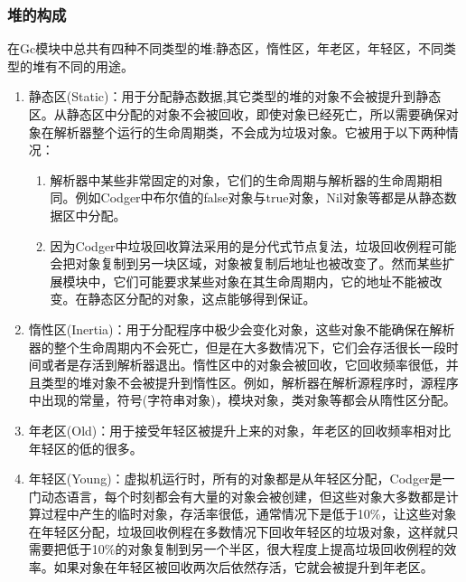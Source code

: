 \subsubsection{堆的构成}
在Gc模块中总共有四种不同类型的堆:静态区，惰性区，年老区，年轻区，不同类型的堆有不同的用途。
\begin{enumerate}
\item 静态区(Static)：用于分配静态数据,其它类型的堆的对象不会被提升到静态区。从静态区中分配的对象不会被回收，即使对象已经死亡，所以需要确保对象在解析器整个运行的生命周期类，不会成为垃圾对象。它被用于以下两种情况：
\begin{enumerate}
\item 解析器中某些非常固定的对象，它们的生命周期与解析器的生命周期相同。例如Codger中布尔值的false对象与true对象，Nil对象等都是从静态数据区中分配。
\item 因为Codger中垃圾回收算法采用的是分代式节点复法，垃圾回收例程可能会把对象复制到另一块区域，对象被复制后地址也被改变了。然而某些扩展模块中，它们可能要求某些对象在其生命周期内，它的地址不能被改变。在静态区分配的对象，这点能够得到保证。
\end{enumerate}
\item 惰性区(Inertia)：用于分配程序中极少会变化对象，这些对象不能确保在解析器的整个生命周期内不会死亡，但是在大多数情况下，它们会存活很长一段时间或者是存活到解析器退出。惰性区中的对象会被回收，它回收频率很低，并且类型的堆对象不会被提升到惰性区。例如，解析器在解析源程序时，源程序中出现的常量，符号(字符串对象)，模块对象，类对象等都会从隋性区分配。
\item 年老区(Old)：用于接受年轻区被提升上来的对象，年老区的回收频率相对比年轻区的低的很多。
\item 年轻区(Young)：虚拟机运行时，所有的对象都是从年轻区分配，Codger是一门动态语言，每个时刻都会有大量的对象会被创建，但这些对象大多数都是计算过程中产生的临时对象，存活率很低，通常情况下是低于10\%，让这些对象在年轻区分配，垃圾回收例程在多数情况下回收年轻区的垃圾对象，这样就只需要把低于10\%的对象复制到另一个半区，很大程度上提高垃圾回收例程的效率。如果对象在年轻区被回收两次后依然存活，它就会被提升到年老区。
\end{enumerate}

